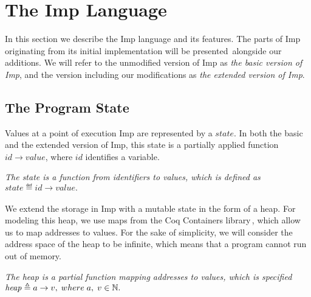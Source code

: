 \section{The Imp Language}
\label{sec:background_imp}
In this section we describe the Imp language and its features. The parts of Imp originating from its initial implementation will be presented\,\cite{Pierce:SF} alongside our additions. We will refer to the unmodified version of Imp as \textit{the basic version of Imp}, and the version including our modifications as \textit{the extended version of Imp}.

\subsection{The Program State}
\label{sec:the_program_state}
Values at a point of execution Imp are represented by a $state$. In both the basic and the extended version of Imp, this state is a partially applied function $id \to value$, where $id$ identifies a variable. 

 \textit{The state is a function from identifiers to values, which is defined as }$state \eqdef id \to value.$

\paragraph{}
We extend the storage in Imp with a mutable state in the form of a heap. For modeling this heap, we use maps from the Coq Containers library\,\cite{CoqContainers}, which allow us to map addresses to values. For the sake of simplicity, we will consider the address space of the heap to be infinite, which means that a program cannot run out of memory. 

 \textit{The heap is a partial function mapping addresses to values, which is specified } $\mathit{heap} \mathrel{\triangleq} a\to v, \; where\; a, \;v \in \mathbb{N}.$

